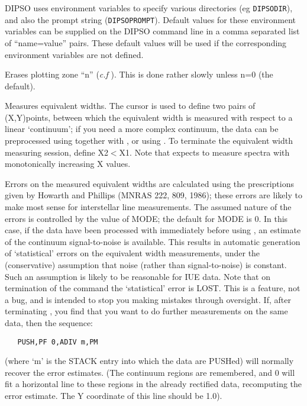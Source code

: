 \begin {description}
DIPSO uses environment variables to specify various directories (eg
\verb+DIPSODIR+), and also the prompt string (\verb+DIPSOPROMPT+).
Default values for these environment variables can be supplied
on the DIPSO command line in a comma separated list of ``name=value''
pairs. These default values will be used if the corresponding environment
variables are not defined. 

Erases plotting zone ``n'' ({\it c.f} ).  This is done rather slowly
unless n=0 (the default).

Measures equivalent widths. The cursor is used to define two pairs of
(X,Y)points, between which the equivalent width is measured with
respect to a linear `continuum'; if you need a more complex continuum,
the data can be preprocessed using   together with ,  or using
.  To terminate the equivalent width measuring session, define
X2$<$X1. Note that   expects to measure spectra with monotonically
increasing X values.

Errors on the measured equivalent widths are calculated using the
prescriptions given by Howarth and Phillips (MNRAS 222, 809, 1986);
these errors are likely to make most sense for interstellar line
measurements. The assumed nature of the errors is controlled by the
value of MODE; the default for MODE is 0. In this case, if the data
have been processed with   immediately before using ,  an estimate
of the continuum signal-to-noise is available. This results in
automatic generation of `statistical' errors on the equivalent width
measurements, under the (conservative) assumption that noise (rather
than signal-to-noise) is constant. Such an assumption is likely to be
reasonable for IUE data. Note that on termination of the   command
the `statistical' error is LOST. This is a feature, not a bug, and is
intended to stop you making mistakes through oversight. If, after
terminating ,  you find that you want to do further measurements on
the same data, then the sequence:

\begin{verbatim}
   PUSH,PF 0,ADIV m,PM
\end{verbatim}

(where `m' is the STACK entry into which the data are PUSHed) will
normally recover the error estimates. (The   continuum regions are
remembered, and   0 will fit a horizontal line to these regions in
the already rectified data, recomputing the error estimate. The Y
coordinate of this line should be 1.0).


\end{description}
